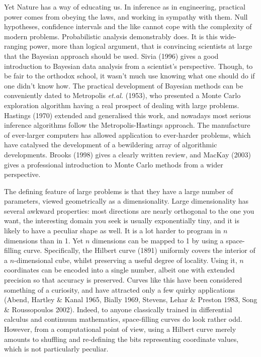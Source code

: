 Yet Nature has a way of educating us.
In inference as in engineering, practical power comes from obeying the laws, and working in sympathy with them.
Null hypotheses, confidence intervals and the like cannot cope with the complexity of modern problems.
Probabilistic analysis demonstrably does.
It is this wide-ranging power, more than logical argument, that is convincing scientists at large that the Bayesian approach should be used.
Sivia (1996) gives a good introduction to Bayesian data analysis from a scientist's perspective.
Though, to be fair to the orthodox school, it wasn't much use knowing what one should do if one didn't know how.
The practical development of Bayesian methods can be conveniently dated to Metropolis {\it et.al.} (1953), 
who presented a Monte Carlo exploration algorithm having a real prospect of dealing with large problems.
Hastings (1970) extended and generalised this work, and nowadays most serious inference algorithms follow the Metropolis-Hastings approach.
The manufacture of ever-larger computers has allowed application to ever-harder problems, 
which have catalysed the development of a bewildering array of algorithmic developments.
Brooks (1998) gives a clearly written review, and MacKay (2003) gives a professional introduction to Monte Carlo methods from a wider perspective.

The defining feature of large problems is that they have a large number of parameters, viewed geometrically as a dimensionality.
Large dimensionality has several awkward properties: most directions are nearly orthogonal to the one you want, 
the interesting domain you seek is usually exponentially tiny,
and it is likely to have a peculiar shape as well.
It is a lot harder to program in $n$ dimensions than in 1.
Yet $n$ dimensions can be mapped to 1 by using a space-filling curve.
Specifically, the Hilbert curve (1891) uniformly covers the interior of a $n$-dimensional cube, whilst preserving a useful degree of locality.
Using it, $n$ coordinates can be encoded into a single number, albeit one with extended precision so that accuracy is preserved.
Curves like this have been considered something of a curiosity, 
and have attracted only a few quirky applications (Abend, Hartley \& Kanal 1965, Bially 1969, Stevens, Lehar \& Preston 1983, Song \& Roussopoulos 2002).
Indeed, to anyone classically trained in differential calculus and continuum mathematics, space-filling curves do look rather odd.
However, from a computational point of view, using a Hilbert curve merely amounts to shuffling and re-defining the bits representing coordinate values, 
which is not particularly peculiar.

